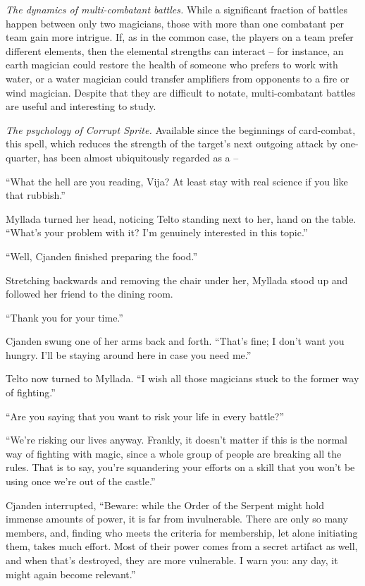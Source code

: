 {	\emph{The dynamics of multi-combatant battles.} While a significant fraction of battles happen between only two magicians, those with more than one combatant per team gain more intrigue. If, as in the common case, the players on a team prefer different elements, then the elemental strengths can interact -- for instance, an earth magician could restore the health of someone who prefers to work with water, or a water magician could transfer amplifiers from opponents to a fire or wind magician. Despite that they are difficult to notate, multi-combatant battles are useful and interesting to study.
	
	\emph{The psychology of Corrupt Sprite.} Available since the beginnings of card-combat, this spell, which reduces the strength of the target's next outgoing attack by one-quarter, has been almost ubiquitously regarded as a --
}

``What the hell are you reading, Vija? At least stay with real science if you like that rubbish.''

Myllada turned her head, noticing Telto standing next to her, hand on the table. ``What's your problem with it? I'm genuinely interested in this topic.''

``Well, Cjanden finished preparing the food.''

Stretching backwards and removing the chair under her, Myllada stood up and followed her friend to the dining room.

\centeredstars

``Thank you for your time.''

Cjanden swung one of her arms back and forth. ``That's fine; I don't want you hungry. I'll be staying around here in case you need me.''

Telto now turned to Myllada. ``I wish all those magicians stuck to the former way of fighting.''

``Are you saying that you want to risk your life in every battle?''

``We're risking our lives anyway. Frankly, it doesn't matter if this is the normal way of fighting with magic, since a whole group of people are breaking all the rules. That is to say, you're squandering your efforts on a skill that you won't be using once we're out of the castle.''

Cjanden interrupted, ``Beware: while the Order of the Serpent might hold immense amounts of power, it is far from invulnerable. There are only so many members, and, finding who meets the criteria for membership, let alone initiating them, takes much effort. Most of their power comes from a secret artifact as well, and when that's destroyed, they are more vulnerable. I warn you: any day, it might again become relevant.''

